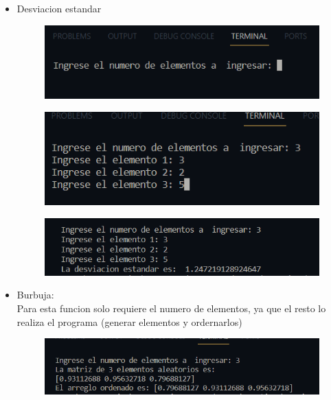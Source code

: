 \documentclass[12pt]{article}
\begin{document}
	\begin{itemize}
	\item Desviacion estandar
	\begin{figure}[H]
		\begin{center}
 			\includegraphics[width = .6\textwidth]{1_3.png}
		\end{center} 
	\end{figure}
	
	\begin{figure}[H]
		\begin{center}
 			\includegraphics[width = .6\textwidth]{1_4.png}
		\end{center} 
	\end{figure}
	
	\begin{figure}[H]
		\begin{center}
 			\includegraphics[width = .6\textwidth]{1_5.png}
		\end{center} 
	\end{figure}
	
	\item Burbuja:\\
	Para esta funcion solo requiere el numero de elementos, ya que el resto lo realiza el programa (generar elementos y ordernarlos)
	\begin{figure}[H]
		\begin{center}
 			\includegraphics[width = .6\textwidth]{1_6.png}
		\end{center} 
	\end{figure}
	

\end{itemize}
\end{document}
